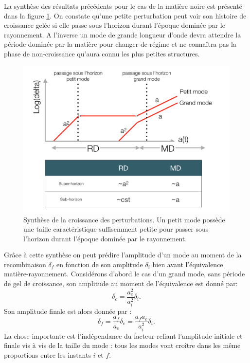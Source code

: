 La synthèse des résultats précédents pour le cas de la matière noire est présenté dans la figure \ref{f:perturb}. On constate qu'une petite perturbation peut voir son histoire de croissance gelée si elle passe sous l'horizon durant l'époque dominée par le rayonnement. A l'inverse un mode de grande longueur d'onde devra attendre la période dominée par la matière pour changer de régime et ne connaîtra pas la phase de non-croissance qu'aura connu les plus petites structures.

\begin{figure}[htbp]
	\centering
		\includegraphics[height=8cm]{figs/perturb.png}
		\caption[Synthèse de la croissance des perturbations]{Synthèse de la croissance des perturbations. Un petit mode possède une taille caractéristique suffisemment petite pour passer sous l'horizon durant l'époque dominée par le rayonnement.}
	\label{f:perturb}
\end{figure}

Grâce à cette synthèse on peut prédire l'amplitude d'un mode au moment de la recombinaison $\delta_f$ en fonction de son amplitude $\delta_i$ bien avant l'équivalence matière-rayonnement. Considérons d'abord le cas d'un grand mode, sans période de gel de croissance, son amplitude au moment de l'équivalence est donné par:
\begin{equation}
\delta_e=\frac{a_e^2}{a_i^2}\delta_i.
\end{equation}
Son amplitude finale est alors donnée par :
\begin{equation}
\delta_f=\frac{a_f}{a_e}\delta_e=\frac{a_f a_e}{a_i^2}\delta_i.
\end{equation}
La chose importante est l'indépendance du facteur reliant l'amplitude initiale et finale vis à vis de la taille du mode : tous les modes vont croître dans les même proportions entre les instants $i$ et $f$. 


